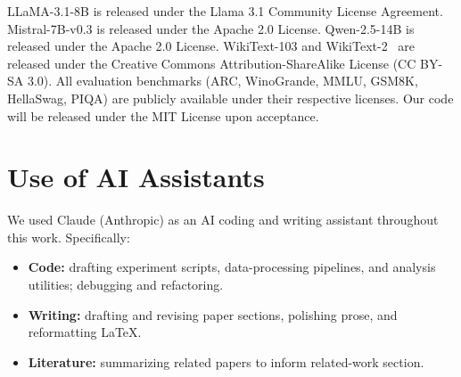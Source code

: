 LLaMA-3.1-8B is released under the Llama 3.1 Community License Agreement.
Mistral-7B-v0.3 is released under the Apache 2.0 License.
Qwen-2.5-14B is released under the Apache 2.0 License.
WikiText-103 and WikiText-2~\cite{merity2017pointer} are released under the Creative Commons Attribution-ShareAlike License (CC BY-SA 3.0).
All evaluation benchmarks (ARC, WinoGrande, MMLU, GSM8K, HellaSwag, PIQA) are publicly available under their respective licenses.
Our code will be released under the MIT License upon acceptance.

\section{Use of AI Assistants}
\label{app:ai-assistants}

We used Claude (Anthropic) as an AI coding and writing assistant
throughout this work. Specifically:
\begin{itemize}
    \item \textbf{Code:} drafting experiment scripts, data-processing
    pipelines, and analysis utilities; debugging and refactoring.
    \item \textbf{Writing:} drafting and revising paper sections,
    polishing prose, and reformatting LaTeX.
    \item \textbf{Literature:} summarizing related papers to inform
    related-work section.
\end{itemize}
